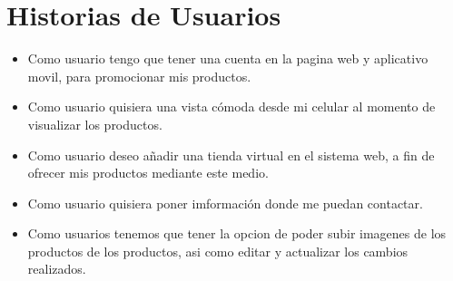 \chapter{Historias de Usuarios}
\begin{itemize}
\item Como usuario tengo que tener una cuenta en la pagina web  y aplicativo movil, para promocionar mis productos.
\item Como usuario quisiera una vista cómoda desde mi celular al momento de visualizar los productos.
\item Como usuario deseo añadir una tienda virtual en el sistema web, a fin de ofrecer mis productos mediante este medio.
\item Como usuario quisiera poner imformación donde me puedan contactar.

\item Como usuarios tenemos que tener la opcion de poder subir imagenes de los productos de los productos, asi como editar y actualizar los cambios realizados.
\end{itemize}